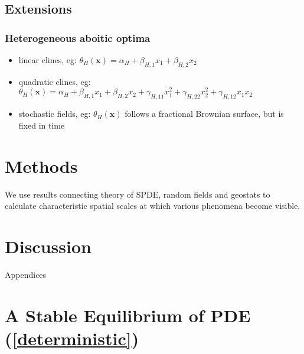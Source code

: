 \documentclass{article}
\begin{document}
\hypertarget{extensions}{%
\subsection{Extensions}\label{extensions}}

\hypertarget{heterogeneous-aboitic-optima}{%
\subsubsection{Heterogeneous aboitic
optima}\label{heterogeneous-aboitic-optima}}

\begin{itemize}
\tightlist
\item
  linear clines, eg:
  \(\theta_H(\pmb x)=\alpha_H+\beta_{H,1}x_1+\beta_{H,2}x_2\)
\item
  quadratic clines, eg:
  \(\theta_H(\pmb x)=\alpha_H+\beta_{H,1}x_1+\beta_{H,2}x_2+\gamma_{H,11}x_1^2+\gamma_{H,22}x_2^2+\gamma_{H,12}x_1x_2\)
\item
  stochastic fields, eg: \(\theta_H(\pmb x)\) follows a fractional
  Brownian surface, but is fixed in time
\end{itemize}

\hypertarget{methods}{%
\section{Methods}\label{methods}}

We use results connecting theory of SPDE, random fields and geostats to
calculate characteristic spatial scales at which various phenomena
become visible.

\hypertarget{discussion}{%
\section{Discussion}\label{discussion}}

\newpage

\begin{center}
  \Large Appendices
\end{center}

\appendix

\hypertarget{a-stable-equilibrium-of-pde}{%
\section{\texorpdfstring{A Stable Equilibrium of PDE
(\ref{deterministic})}{A Stable Equilibrium of PDE ()}}\label{a-stable-equilibrium-of-pde}}
\end{document}
